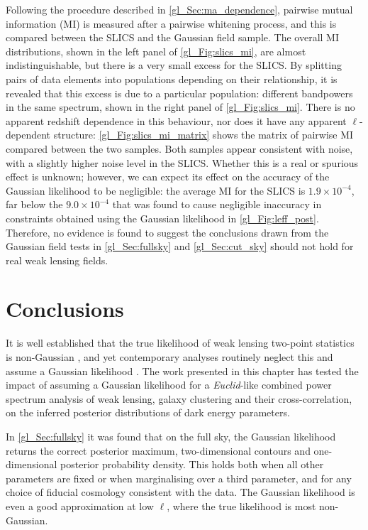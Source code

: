 Following the procedure described in \autoref{gl_Sec:ma_dependence}, pairwise mutual information (MI) is measured after a pairwise whitening process, and this is compared between the SLICS and the Gaussian field sample.
The overall MI distributions, shown in the left panel of \autoref{gl_Fig:slics_mi}, are almost indistinguishable, but there is a very small excess for the SLICS.
By splitting pairs of data elements into populations depending on their relationship, it is revealed that this excess is due to a particular population: different bandpowers in the same spectrum, shown in the right panel of \autoref{gl_Fig:slics_mi}.
There is no apparent redshift dependence in this behaviour, nor does it have any apparent $\ell$-dependent structure: \autoref{gl_Fig:slics_mi_matrix} shows the matrix of pairwise MI compared between the two samples. Both samples appear consistent with noise, with a slightly higher noise level in the SLICS. Whether this is a real or spurious effect is unknown; however, we can expect its effect on the accuracy of the Gaussian likelihood to be negligible: the average MI for the SLICS is $1.9 \times 10^{-4}$, far below the $9.0 \times 10^{-4}$ that was found to cause negligible inaccuracy in constraints obtained using the Gaussian likelihood in \autoref{gl_Fig:leff_post}. Therefore, no evidence is found to suggest the conclusions drawn from the Gaussian field tests in \autoref{gl_Sec:fullsky} and \autoref{gl_Sec:cut_sky} should not hold for real weak lensing fields.

\section{Conclusions}
\label{gl_Sec:conclusions}

It is well established that the true likelihood of weak lensing two-point statistics is non-Gaussian \citep{Sellentin2018, Sellentin2018a, DiazRivero2020, Louca2020}, and yet contemporary analyses routinely neglect this and assume a Gaussian likelihood \citep{Troxel2018, Hikage2019, Joachimi2021}. The work presented in this chapter has tested the impact of assuming a Gaussian likelihood for a \textit{Euclid}-like combined power spectrum analysis of weak lensing, galaxy clustering and their cross-correlation, on the inferred posterior distributions of dark energy parameters.

In \autoref{gl_Sec:fullsky} it was found that on the full sky, the Gaussian likelihood returns the correct posterior maximum, two-dimensional contours and one-dimensional posterior probability density. This holds both when all other parameters are fixed or when marginalising over a third parameter, and for any choice of fiducial cosmology consistent with the data. The Gaussian likelihood is even a good approximation at low $\ell$, where the true likelihood is most non-Gaussian.

